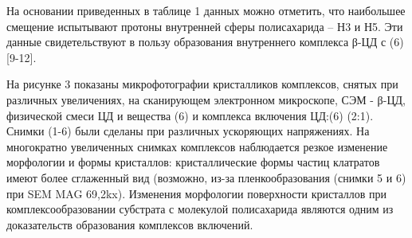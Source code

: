 На основании приведенных в таблице 1 данных можно отметить, что
наибольшее смещение испытывают протоны внутренней сферы полисахарида --
Н3 и Н5. Эти данные свидетельствуют в пользу образования внутреннего
комплекса β-ЦД с (6) {[}9-12{]}.

На рисунке 3 показаны микрофотографии кристалликов комплексов, снятых
при различных увеличениях, на сканирующем электронном микроскопе, СЭМ -
β-ЦД, физической смеси ЦД и вещества (6) и комплекса включения ЦД:(6)
(2:1). Снимки (1-6) были сделаны при различных ускоряющих напряжениях.
На многократно увеличенных снимках комплексов наблюдается резкое
изменение морфологии и формы кристаллов: кристаллические формы частиц
клатратов имеют более сглаженный вид (возможно, из-за пленкообразования
(снимки 5 и 6) при SEM MAG 69,2kx). Изменения морфологии поверхности
кристаллов при комплексообразовании субстрата с молекулой полисахарида
являются одним из доказательств образования комплексов включений.


